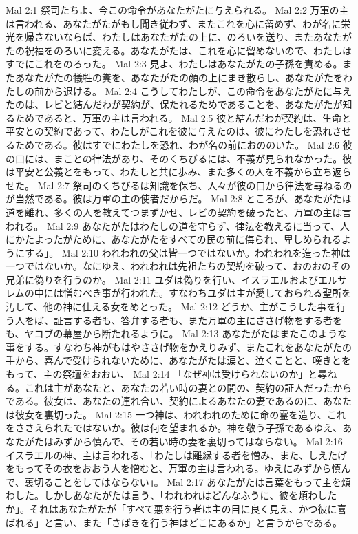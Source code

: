 Mal 2:1  祭司たちよ、今この命令があなたがたに与えられる。
Mal 2:2  万軍の主は言われる、あなたがたがもし聞き従わず、またこれを心に留めず、わが名に栄光を帰さないならば、わたしはあなたがたの上に、のろいを送り、またあなたがたの祝福をのろいに変える。あなたがたは、これを心に留めないので、わたしはすでにこれをのろった。
Mal 2:3  見よ、わたしはあなたがたの子孫を責める。またあなたがたの犠牲の糞を、あなたがたの顔の上にまき散らし、あなたがたをわたしの前から退ける。
Mal 2:4  こうしてわたしが、この命令をあなたがたに与えたのは、レビと結んだわが契約が、保たれるためであることを、あなたがたが知るためであると、万軍の主は言われる。
Mal 2:5  彼と結んだわが契約は、生命と平安との契約であって、わたしがこれを彼に与えたのは、彼にわたしを恐れさせるためである。彼はすでにわたしを恐れ、わが名の前におののいた。
Mal 2:6  彼の口には、まことの律法があり、そのくちびるには、不義が見られなかった。彼は平安と公義とをもって、わたしと共に歩み、また多くの人を不義から立ち返らせた。
Mal 2:7  祭司のくちびるは知識を保ち、人々が彼の口から律法を尋ねるのが当然である。彼は万軍の主の使者だからだ。
Mal 2:8  ところが、あなたがたは道を離れ、多くの人を教えてつまずかせ、レビの契約を破ったと、万軍の主は言われる。
Mal 2:9  あなたがたはわたしの道を守らず、律法を教えるに当って、人にかたよったがために、あなたがたをすべての民の前に侮られ、卑しめられるようにする」。
Mal 2:10  われわれの父は皆一つではないか。われわれを造った神は一つではないか。なにゆえ、われわれは先祖たちの契約を破って、おのおのその兄弟に偽りを行うのか。
Mal 2:11  ユダは偽りを行い、イスラエルおよびエルサレムの中には憎むべき事が行われた。すなわちユダは主が愛しておられる聖所を汚して、他の神に仕える女をめとった。
Mal 2:12  どうか、主がこうした事を行う人をば、証言する者も、答弁する者も、また万軍の主にささげ物をする者をも、ヤコブの幕屋から断たれるように。
Mal 2:13  あなたがたはまたこのような事をする。すなわち神がもはやささげ物をかえりみず、またこれをあなたがたの手から、喜んで受けられないために、あなたがたは涙と、泣くことと、嘆きとをもって、主の祭壇をおおい、
Mal 2:14  「なぜ神は受けられないのか」と尋ねる。これは主があなたと、あなたの若い時の妻との間の、契約の証人だったからである。彼女は、あなたの連れ合い、契約によるあなたの妻であるのに、あなたは彼女を裏切った。
Mal 2:15  一つ神は、われわれのために命の霊を造り、これをささえられたではないか。彼は何を望まれるか。神を敬う子孫であるゆえ、あなたがたはみずから慎んで、その若い時の妻を裏切ってはならない。
Mal 2:16  イスラエルの神、主は言われる、「わたしは離縁する者を憎み、また、しえたげをもってその衣をおおう人を憎むと、万軍の主は言われる。ゆえにみずから慎んで、裏切ることをしてはならない」。
Mal 2:17  あなたがたは言葉をもって主を煩わした。しかしあなたがたは言う、「われわれはどんなふうに、彼を煩わしたか」。それはあなたがたが「すべて悪を行う者は主の目に良く見え、かつ彼に喜ばれる」と言い、また「さばきを行う神はどこにあるか」と言うからである。
